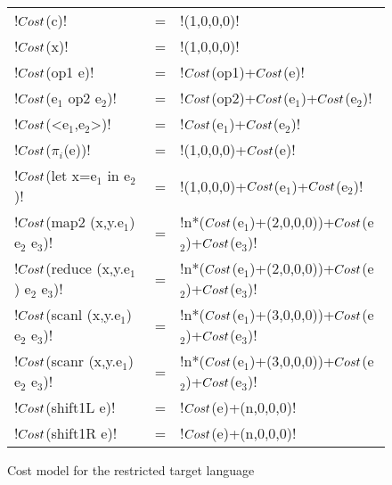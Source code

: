 \begin{figure*}[t]
    \begin{tabular}{|l c l|}
        \hline
      !$Cost$(c)! &=& !(1,0,0,0)! \\ 
      !$Cost$(x)! &=& !(1,0,0,0)! \\ 
      !$Cost$(op1 e)! &=& !$Cost$(op1)+$Cost$(e)! \\ 
      !$Cost$(e$_1$ op2 e$_2$)! &=& !$Cost$(op2)+$Cost$(e$_1$)+$Cost$(e$_2$)! \\ 
      !$Cost$(<e$_1$,e$_2$>)! &=& !$Cost$(e$_1$)+$Cost$(e$_2$)! \\ 
      !$Cost$($\pi_i$(e))! &=& !(1,0,0,0)+$Cost$(e)! \\ 
      !$Cost$(let x=e$_1$ in e$_2$)! &=& !(1,0,0,0)+$Cost$(e$_1$)+$Cost$(e$_2$)! \\ 
      !$Cost$(map2 (x,y.e$_1$) e$_2$ e$_3$)! &=& !n*($Cost$(e$_1$)+(2,0,0,0))+$Cost$(e$_2$)+$Cost$(e$_3$)! \\ 
      !$Cost$(reduce (x,y.e$_1$) e$_2$ e$_3$)! &=& !n*($Cost$(e$_1$)+(2,0,0,0))+$Cost$(e$_2$)+$Cost$(e$_3$)! \\ 
      !$Cost$(scanl (x,y.e$_1$) e$_2$ e$_3$)! &=& !n*($Cost$(e$_1$)+(3,0,0,0))+$Cost$(e$_2$)+$Cost$(e$_3$)! \\ 
      !$Cost$(scanr (x,y.e$_1$) e$_2$ e$_3$)! &=& !n*($Cost$(e$_1$)+(3,0,0,0))+$Cost$(e$_2$)+$Cost$(e$_3$)! \\ 
      !$Cost$(shift1L e)! &=& !$Cost$(e)+(n,0,0,0)! \\ 
      !$Cost$(shift1R e)! &=& !$Cost$(e)+(n,0,0,0)! \\ 
      \hline
    \end{tabular}
    \vspace{-0.4cm}
    \caption{Cost model for the restricted target language}
    \label{fig:costmodel}
    \vspace{-0.4cm}
\end{figure*}